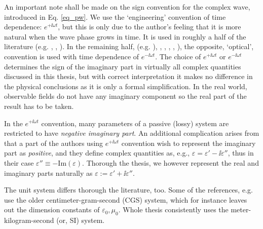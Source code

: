 An important note shall be made on the sign convention for the complex wave, introduced in Eq. \ref{eq_pw}.
We use the `engineering' convention of time dependence: $e^{+\ii \omega t}$, but this is only due to the author's feeling that it is more natural when the wave phase grows in time. 
It is used in  roughly a half of the literature (e.g. \cite[p. 9]{engheta2006book}, \cite[pp. 21, 99]{krowne2007book}, \cite[(Chapters 1-4, 6, 9, 10)]{eleftheriades2005book}).  In the remaining half, (e.g. \cite[(Chapters 5, 7, 8)]{eleftheriades2005book}), \cite{klingshirn2007semiconductor}, \cite{jackson1962book}, \cite{veselago1968}, \cite{born1999book}, \cite[p. 5]{noginov2011book}), the opposite, `optical', convention is used with time dependence of $e^{-\ii \omega t}$. The choice of $e^{+\ii\omega t}$ or $e^{-\ii\omega t}$ determines the sign of the imaginary part in virtually all complex quantities discussed in this thesis, but with correct interpretation it makes no difference in the physical conclusions as it is only a formal simplification.
In the real world, observable fields do not have any imaginary component so the real part of the result has to be taken. 

In the $e^{+\ii\omega t}$ convention, many parameters of a passive (lossy) system are restricted to have \textit{negative imaginary part}.  An additional complication arises from that a part of the authors using $e^{+\ii\omega t}$ convention wish to represent the imaginary part as \textit{positive}, and they define complex quantities as, e.g., $\varepsilon = \varepsilon' - \ii \varepsilon''$, %
thus in their case $\varepsilon''\equiv -\text{Im}(\varepsilon)$. Thorough the thesis, we however represent the real and imaginary parts naturally as $\varepsilon := \varepsilon' + \ii \varepsilon''$.

The unit system differs thorough the literature, too. Some of the references, e.g. \cite{landau1984electrodynamics, agranovich2006spatial, krowne2007book_agran} use the older centimeter-gram-second (CGS) system, which for instance leaves out the dimension constants of $\varepsilon_0, \mu_0$. Whole thesis consistently uses the meter-kilogram-second (or, SI) system.

